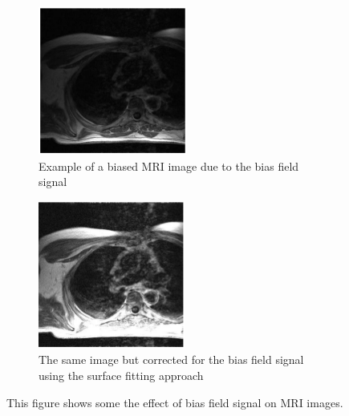 \begin{figure}
\centering
\begin{subfigure}{.5\textwidth}
  \centering
  \includegraphics[width=.6\linewidth]{baisedMRIimage.png}
  \caption{Example of a biased MRI image due to the bias field signal}
  \label{fig:baisedMRI}
\end{subfigure}%
\begin{subfigure}{.5\textwidth}
  \centering
  \includegraphics[width=.6\linewidth]{CorrectedMRIBias.png}
  \caption{The same image but corrected for the bias field signal using the surface fitting approach}
  \label{fig:correctedMRI}
\end{subfigure}
\caption{This figure shows some the effect of bias field signal on MRI images. }
\label{fig:biasedvscorrMRI}
\end{figure}
    

